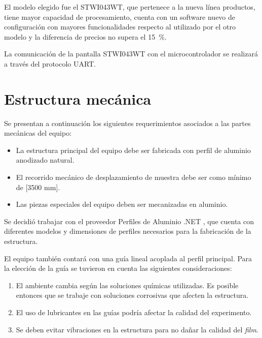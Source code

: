 El modelo elegido fue el STWI043WT, que pertenece a la nueva línea productos, tiene mayor capacidad de procesamiento, cuenta con un software nuevo de configuración con mayores funcionalidades respecto al utilizado por el otro modelo y la diferencia de precios no supera el \SI{15}{\percent}.  

La comunicación de la pantalla STWI043WT con el microcontrolador se realizará a través del protocolo UART.



\section{Estructura mecánica}

Se presentan a continuación los siguientes requerimientos asociados a las partes mecánicas del equipo: 

\begin{itemize}
\item La estructura principal del equipo debe ser fabricada con perfil de aluminio anodizado natural.
\item El recorrido mecánico de desplazamiento de muestra debe ser como mínimo de [3500 mm].
\item Las piezas especiales del equipo deben ser mecanizadas en aluminio.

\end{itemize}

Se decidió trabajar con el proveedor Perfiles de Aluminio .NET \citep{web_perfiles_net}, que cuenta con diferentes modelos y dimensiones de perfiles necesarios para la fabricación de la estructura.

El equipo también contará con una guía lineal acoplada al perfil principal. Para la elección de la guía se tuvieron en cuenta las siguientes consideraciones:

\begin{enumerate}
\item El ambiente cambia  según las soluciones químicas utilizadas. Es posible entonces que se trabaje con soluciones corrosivas que afecten la estructura.  
\item El uso de lubricantes en las guías podría afectar la calidad del experimento.
\item Se deben evitar vibraciones en la estructura para no dañar la calidad del \textit{film}.

\end{enumerate}

